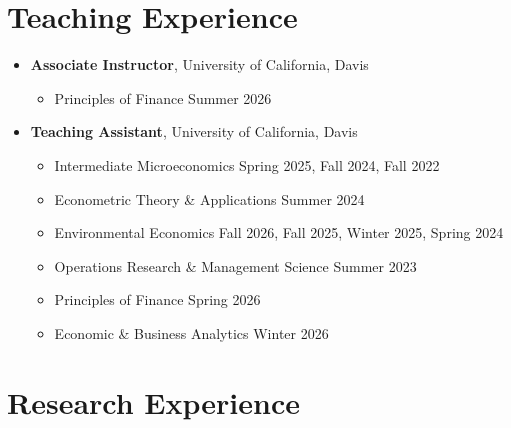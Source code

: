 \documentclass{article}[12]
\begin{document}
\section{Teaching Experience}

\begin{itemize}[itemsep=0.5em]
    
    \item \textbf{Associate Instructor}, University of California, Davis
    \begin{itemize}
        \item Principles of Finance \hfill Summer 2026
    \end{itemize}

    \item \textbf{Teaching Assistant}, University of California, Davis
    \begin{itemize}
        \item Intermediate Microeconomics \hfill Spring 2025, Fall 2024, Fall 2022
        \item Econometric Theory \& Applications \hfill Summer 2024 
        \item Environmental Economics \hfill Fall 2026, Fall 2025, Winter 2025, Spring 2024
        \item Operations Research \& Management Science \hfill Summer 2023
        \item Principles of Finance \hfill Spring 2026
        \item Economic \& Business Analytics \hfill Winter 2026
    \end{itemize}
    
\end{itemize}

\section{Research Experience}
\end{document}
